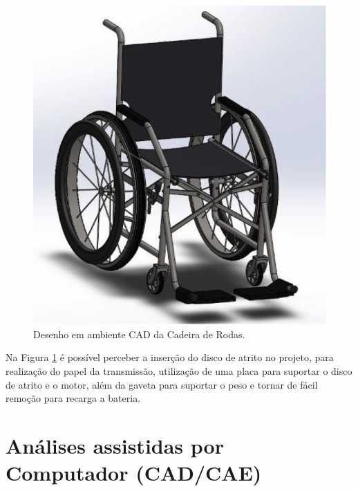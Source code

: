 \begin{figure}[!htb]
    \begin{center}
        \includegraphics{figuras/first_cad_chair.png}
    \end{center}
    \caption{Desenho em ambiente CAD da Cadeira de Rodas.}
    \label{fig:first_cad_chair}
\end{figure}

Na Figura \ref{fig:first_cad_chair} é possível perceber a inserção do disco de
atrito no projeto, para realização do papel da transmissão, utilização de uma
placa para suportar o disco de atrito e o motor, além da gaveta para suportar o
peso e tornar de fácil remoção para recarga a bateria.

\section{Análises assistidas por Computador (CAD/CAE)}

